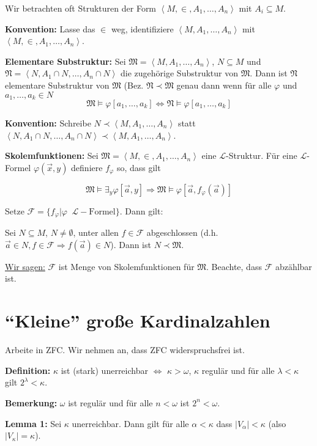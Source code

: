 \documentclass[a4paper,fontsize=11pt]{scrartcl}
\begin{document}
Wir betrachten oft Strukturen der Form
$\left<M,\in,A_1,\ldots,A_n\right>$ mit $A_i\subseteq M$.

{\bf Konvention:} Lasse das $\in$ weg, identifiziere
$\left<M,A_1,\ldots,A_n\right>$ mit
$\left<M,\in,A_1,\ldots,A_n\right>$.

{\bf Elementare Substruktur:} Sei
$\mathfrak{M}=\left<M,A_1,\ldots,A_n\right>$, $N\subseteq M$ und
$\mathfrak{N}=\left<N,A_1\cap N,\ldots,A_n\cap N\right>$ die
zugehörige Substruktur von $\mathfrak{M}$. Dann ist $\mathfrak{N}$
elementare Substruktur von $\mathfrak{M}$
(Bez. $\mathfrak{N}\prec\mathfrak{M}$ genau dann wenn für alle
$\varphi$ und $a_1,\ldots,a_k\in N$
$$ \mathfrak{M}\models \varphi[a_1,\ldots,a_k] \Leftrightarrow
\mathfrak{N}\models\varphi[a_1,\ldots,a_k]$$

{\bf Konvention:} Schreibe $N\prec\left<M,A_1,\ldots,A_n\right>$ statt
$\left<N,A_1\cap N,\ldots,A_n\cap
N\right>\prec\left<M,A_1,\ldots,A_n\right>$.

{\bf Skolemfunktionen:} Sei
$\mathfrak{M}=\left<M,\in,A_1,\ldots,A_n\right>$ eine
${\mathcal{L}}$-Struktur. Für eine $\mathcal{L}$-Formel
$\varphi(\vec{x},y)$ definiere $f_\varphi$ so, dass gilt

$$ \mathfrak{M}\models \exists_y \varphi[\vec{a},y] \Rightarrow
\mathfrak{M}\models\varphi[\vec{a},f_\varphi(\vec{a})]$$

Setze
$\mathcal{F}=\{f_\varphi|\varphi\phantom{a}\mathcal{L}-\mbox{Formel}\}$. Dann
gilt:

Sei $N\subseteq M$, $N\neq\emptyset$, unter allen $f\in\mathcal{F}$
abgeschlossen (d.h. $\vec{a}\in N,f\in\mathcal{F}\Rightarrow
f(\vec{a})\in N$). Dann ist $N\prec\mathfrak{M}$.

\underline{Wir sagen:} $\mathcal{F}$ ist Menge von Skolemfunktionen
für $\mathfrak{M}$. Beachte, dass $\mathcal{F}$ abzählbar ist.

\section{``Kleine'' große Kardinalzahlen}
Arbeite in ZFC. Wir nehmen an, dass ZFC widerspruchsfrei ist.

{\bf Definition:} $\kappa$ ist (stark) unerreichbar $\Leftrightarrow$
$\kappa>\omega$, $\kappa$ regulär und für alle $\lambda<\kappa$ gilt
$2^\lambda<\kappa$.

{\bf Bemerkung:} $\omega$ ist regulär und für alle $n<\omega$ ist
$2^n<\omega$.

{\bf Lemma 1:} Sei $\kappa$ unerreichbar. Dann gilt für alle
$\alpha<\kappa$ dass $|V_\alpha|<\kappa$ (also $|V_\kappa|=\kappa$).
\end{document}
